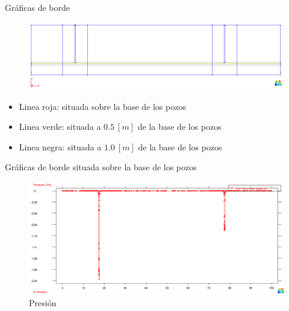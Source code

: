 \documentclass[spanish]{beamer}
\begin{document}
%
\begin{frame}{Gráficas de borde}
\begin{center}
\begin{figure}[htbp]
\centerline{\includegraphics[scale=0.3]{../img/200m/perfiles}}
\end{figure}
\end{center}
\begin{itemize}
\item \color{red} Linea roja: situada sobre la base de los pozos
\item \color{green} Linea verde: situada a $0.5~[m]$ de la base de los pozos
\item \color{black} Linea negra: situada a $1.0~[m]$ de la base de los pozos
\end{itemize}
\end{frame}
%
\begin{frame}{Gráficas de borde situada sobre la base de los pozos}
\begin{center}
\begin{figure}[htbp]
\centerline{\includegraphics[scale=0.25]{../img/100m/grf/100_grafico_presion_x_centro_pozos_distancia0}}
\caption{Presión}
\end{figure}
\end{center}
\end{frame}
%
%
\end{document}

